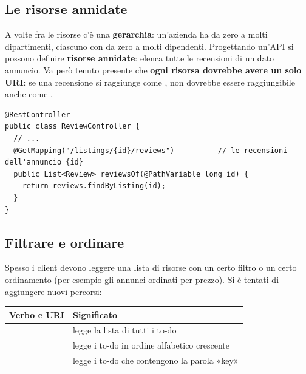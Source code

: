 \subsection{Le risorse annidate}

A volte fra le risorse c'è una \textbf{gerarchia}: un'azienda ha da zero a molti dipartimenti, ciascuno con da zero a
molti dipendenti. Progettando un'API si possono definire \textbf{risorse annidate}: 
elenca tutte le recensioni di un dato annuncio. Va però tenuto presente che \textbf{ogni risorsa dovrebbe avere un solo
URI}: se una recensione si raggiunge come , non dovrebbe essere raggiungibile anche come
.

\begin{lstlisting}[style=java, name=ReviewController.java]
@RestController
public class ReviewController {
  // ...
  @GetMapping("/listings/{id}/reviews")          // le recensioni dell'annuncio {id}
  public List<Review> reviewsOf(@PathVariable long id) {
    return reviews.findByListing(id);
  }
}
\end{lstlisting}

\subsection{Filtrare e ordinare}

Spesso i client devono leggere una lista di risorse con un certo filtro o un certo ordinamento (per esempio gli annunci
ordinati per prezzo). Si è tentati di aggiungere nuovi percorsi:

\begin{center}
\renewcommand{\arraystretch}{1.25}
\begin{tabular}{lP{9.6cm}}
\toprule
\textbf{Verbo e URI} & \textbf{Significato} \\
\midrule
{}            & legge la lista di tutti i to-do \\
   & legge i to-do in ordine alfabetico crescente \\
 & legge i to-do che contengono la parola «key» \\
\bottomrule
\end{tabular}
\end{center}


